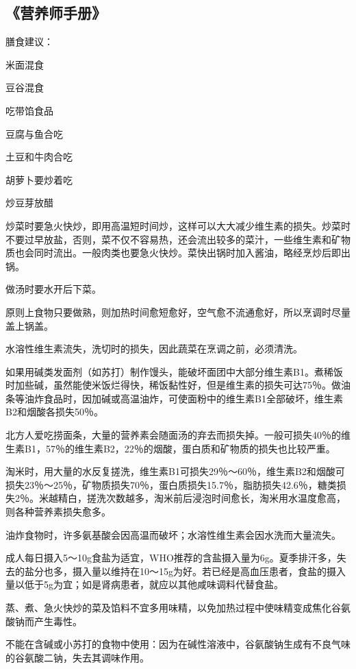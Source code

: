 \subsection{《营养师手册》}

膳食建议：
\begin{itemize*}
	\item 米面混食
	\item 豆谷混食
	\item 吃带馅食品
	\item 豆腐与鱼合吃
	\item 土豆和牛肉合吃
	\item 胡萝卜要炒着吃
	\item 炒豆芽放醋
\end{itemize*}

炒菜时要急火快炒，即用高温短时间炒，这样可以大大减少维生素的损失。炒菜时不要过早放盐，否则，菜不仅不容易热，还会流出较多的菜汁，一些维生素和矿物质也会同时流出。一般肉类也要急火快炒。菜快出锅时加入酱油，略经烹炒后即出锅。

做汤时要水开后下菜。

原则上食物只要做熟，则加热时间愈短愈好，空气愈不流通愈好，所以烹调时尽量盖上锅盖。

水溶性维生素流失，洗切时的损失，因此蔬菜在烹调之前，必须清洗。

如果用碱类发面剂（如苏打）制作馒头，能破坏面团中大部分维生素B1。煮稀饭时加些碱，虽然能使米饭烂得快，稀饭黏性好，但是维生素的损失可达75％。做油条等油炸食品时，因加碱或高温油炸，可使面粉中的维生素B1全部破坏，维生素B2和烟酸各损失50％。

北方人爱吃捞面条，大量的营养素会随面汤的弃去而损失掉。一般可损失40％的维生素B1，57％的维生素B2，22％的烟酸，蛋白质和矿物质的损失也比较严重。

淘米时，用大量的水反复搓洗，维生素B1可损失29％～60％，维生素B2和烟酸可损失23％～25％，矿物质损失70％，蛋白质损失15.7％，脂肪损失42.6％，糖类损失2％。米越精白，搓洗次数越多，淘米前后浸泡时间愈长，淘米用水温度愈高，则各种营养素损失愈多。

油炸食物时，许多氨基酸会因高温而破坏；水溶性维生素会因水洗而大量流失。

成人每日摄入5～10g食盐为适宜，WHO推荐的含盐摄入量为6g。夏季排汗多，失去的盐分也多，摄入量以维持在10～15g为好。若已经是高血压患者，食盐的摄入量以低于5g为宜；如是肾病患者，就应以其他咸味调料代替食盐。

蒸、煮、急火快炒的菜及馅料不宜多用味精，以免加热过程中使味精变成焦化谷氨酸钠而产生毒性。

不能在含碱或小苏打的食物中使用：因为在碱性溶液中，谷氨酸钠生成有不良气味的谷氨酸二钠，失去其调味作用。

